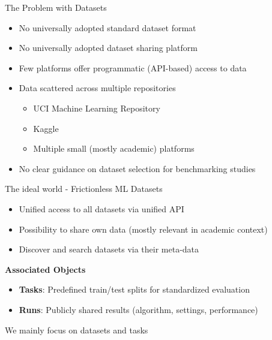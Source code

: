 \documentclass[11pt,compress,t,notes=noshow, xcolor=table]{beamer}
\begin{document}
\begin{vbframe}{The Problem with Datasets}
\vfill
\begin{itemize}
    \item No universally adopted standard dataset format
    \item No universally adopted dataset sharing platform
    \item Few platforms offer programmatic (API-based) access to data
\end{itemize}
\vfill
\pause
\begin{itemize}
    \item Data scattered across multiple repositories
    \begin{itemize}
        \item UCI Machine Learning Repository
        \item Kaggle
        \item Multiple small (mostly academic) platforms
    \end{itemize}
    \item No clear guidance on dataset selection for benchmarking studies
\end{itemize}
\end{vbframe}

\begin{vbframe}{The ideal world - Frictionless ML}
\vfill
Datasets
\begin{itemize}
    \item Unified access to all datasets via unified API
    \item Possibility to share own data (mostly relevant in academic context)
    \item Discover and search datasets via their meta-data
\end{itemize}
\vfill
\textbf{Associated Objects}
\begin{itemize}
    \item \textbf{Tasks}: Predefined train/test splits for standardized evaluation
    \item \textbf{Runs}: Publicly shared results (algorithm, settings, performance)
\end{itemize}
\vfill
\pause
We mainly focus on datasets and tasks
\end{vbframe}
\end{document}
